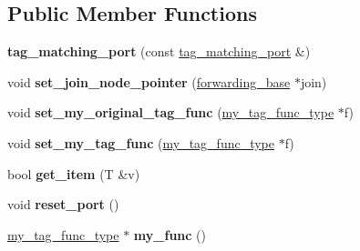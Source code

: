 \subsection*{Public Member Functions}
\begin{DoxyCompactItemize}
\item 
\hypertarget{classinternal_1_1tag__matching__port_a264801a87abaf3ea0eee063ca12fb018}{}{\bfseries tag\+\_\+matching\+\_\+port} (const \hyperlink{classinternal_1_1tag__matching__port}{tag\+\_\+matching\+\_\+port} \&)\label{classinternal_1_1tag__matching__port_a264801a87abaf3ea0eee063ca12fb018}

\item 
\hypertarget{classinternal_1_1tag__matching__port_a03c1ec27ed115324e0c2337df350db07}{}void {\bfseries set\+\_\+join\+\_\+node\+\_\+pointer} (\hyperlink{structinternal_1_1forwarding__base}{forwarding\+\_\+base} $\ast$join)\label{classinternal_1_1tag__matching__port_a03c1ec27ed115324e0c2337df350db07}

\item 
\hypertarget{classinternal_1_1tag__matching__port_a549b2f83c49bb0036ee08d024b24f734}{}void {\bfseries set\+\_\+my\+\_\+original\+\_\+tag\+\_\+func} (\hyperlink{classinternal_1_1function__body}{my\+\_\+tag\+\_\+func\+\_\+type} $\ast$f)\label{classinternal_1_1tag__matching__port_a549b2f83c49bb0036ee08d024b24f734}

\item 
\hypertarget{classinternal_1_1tag__matching__port_ade91eb05978ff0ca5b72b23d0a7a0fc1}{}void {\bfseries set\+\_\+my\+\_\+tag\+\_\+func} (\hyperlink{classinternal_1_1function__body}{my\+\_\+tag\+\_\+func\+\_\+type} $\ast$f)\label{classinternal_1_1tag__matching__port_ade91eb05978ff0ca5b72b23d0a7a0fc1}

\item 
\hypertarget{classinternal_1_1tag__matching__port_a6f8146ff1501edeadc776e49bd43be80}{}bool {\bfseries get\+\_\+item} (T \&v)\label{classinternal_1_1tag__matching__port_a6f8146ff1501edeadc776e49bd43be80}

\item 
\hypertarget{classinternal_1_1tag__matching__port_a26dbf13363b877e3499b95c5176a458d}{}void {\bfseries reset\+\_\+port} ()\label{classinternal_1_1tag__matching__port_a26dbf13363b877e3499b95c5176a458d}

\item 
\hypertarget{classinternal_1_1tag__matching__port_a8347536631c7fddd450b75cae6829539}{}\hyperlink{classinternal_1_1function__body}{my\+\_\+tag\+\_\+func\+\_\+type} $\ast$ {\bfseries my\+\_\+func} ()\label{classinternal_1_1tag__matching__port_a8347536631c7fddd450b75cae6829539}


\end{DoxyCompactItemize}
